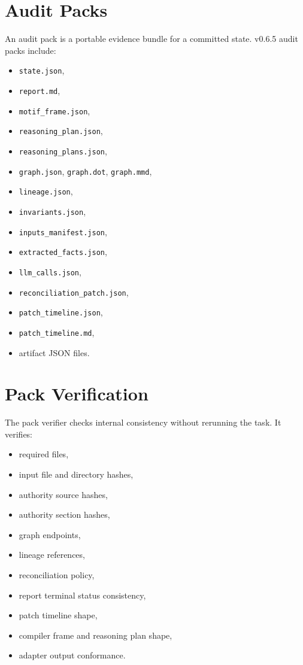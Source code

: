 \documentclass[11pt]{article}
\begin{document}
\section{Audit Packs}

An audit pack is a portable evidence bundle for a committed state. v0.6.5 audit packs include:

\begin{itemize}[leftmargin=1.5em]
  \item \texttt{state.json},
  \item \texttt{report.md},
  \item \texttt{motif\_frame.json},
  \item \texttt{reasoning\_plan.json},
  \item \texttt{reasoning\_plans.json},
  \item \texttt{graph.json}, \texttt{graph.dot}, \texttt{graph.mmd},
  \item \texttt{lineage.json},
  \item \texttt{invariants.json},
  \item \texttt{inputs\_manifest.json},
  \item \texttt{extracted\_facts.json},
  \item \texttt{llm\_calls.json},
  \item \texttt{reconciliation\_patch.json},
  \item \texttt{patch\_timeline.json},
  \item \texttt{patch\_timeline.md},
  \item artifact JSON files.
\end{itemize}

\section{Pack Verification}

The pack verifier checks internal consistency without rerunning the task. It verifies:

\begin{itemize}[leftmargin=1.5em]
  \item required files,
  \item input file and directory hashes,
  \item authority source hashes,
  \item authority section hashes,
  \item graph endpoints,
  \item lineage references,
  \item reconciliation policy,
  \item report terminal status consistency,
  \item patch timeline shape,
  \item compiler frame and reasoning plan shape,
  \item adapter output conformance.
\end{itemize}
\end{document}
